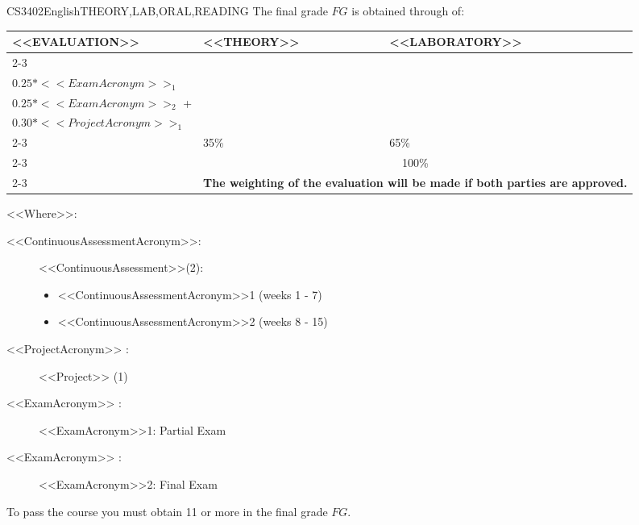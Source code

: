   \begin{evaluation}{CS3402}{English}{THEORY,LAB,ORAL,READING}
  The final grade $FG$ is obtained through of:
 
  \begin{tabularx}{0.9\textwidth}{|X|p{}|p{}|} \hline
  \multirow{4}{*}{\uppercase{<<Evaluation>>}} & \uppercase{<<Theory>>} & \uppercase{<<Laboratory>>} \\ \cline{2-3}
  & %
      \begin{minipage}{0.95\textwidth}
      \begin{tabular}{l}
        $0.10*<<ContinuousAssessmentAcronym>>_{1}$  + \\
        $0.25*<<ExamAcronym>>_{1}$ 
      \end{tabular} 
      \end{minipage} 
  & %
      \begin{minipage}{0.95\textwidth}
      \begin{tabular}{l}
        $0.10*<<ContinuousAssessmentAcronym>>_{2}$  + \\
        $0.25*<<ExamAcronym>>_{2}$  +  \\
        $0.30*<<ProjectAcronym>>_{1}$
      \end{tabular} 
      \end{minipage}                 \\ \cline{2-3}
  
  & %
  35\% 
  & %
  65\% \\ \cline{2-3}
  & \multicolumn{2}{c|}{100\%}  \\ \cline{2-3}
  & \multicolumn{2}{c|}{\textbf{The weighting of the evaluation will be made if both parties are approved.}}  \\ \hline
  \end{tabularx}
    
  \vspace{2mm}
  \noindent <<Where>>:
  \begin{description}
      \item[<<ContinuousAssessmentAcronym>>:]<<ContinuousAssessment>>(2):
      \begin{itemize}
              \item <<ContinuousAssessmentAcronym>>1 (weeks 1 - 7) 
              \item <<ContinuousAssessmentAcronym>>2 (weeks 8 - 15)
      \end{itemize}
      \item[<<ProjectAcronym>> :] <<Project>> (1)
      \item[<<ExamAcronym>> :] <<ExamAcronym>>1: Partial Exam
      \item[<<ExamAcronym>> :] <<ExamAcronym>>2: Final Exam
  \end{description}

  \noindent To pass the course you must obtain 11 or more in the final grade $FG$.
  \end{evaluation}


